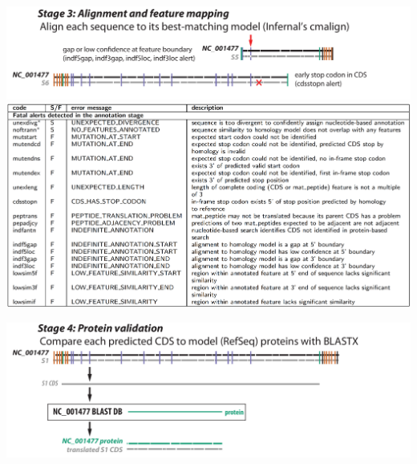 \documentclass[landscape]{slides}
\begin{document}
%
%
%
%
\begin{slide}
\begin{center}

\includegraphics[width=10.5in]{figs/v-annotate-stage3-4}
\includegraphics[width=10.5in]{figs/ss-alignment-alert-list}

\end{center}
\vfill
\end{slide}
\begin{slide}
\begin{center}

\includegraphics[width=10.5in]{figs/v-annotate-stage4-1}

\end{center}
\vfill
\end{slide}
\end{document}
